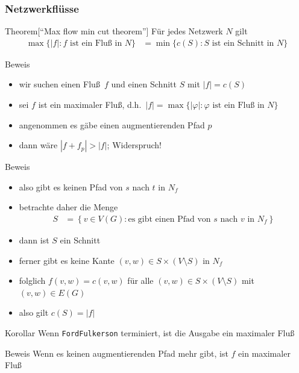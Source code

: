 \documentclass[aspectratio=1610, 11pt]{beamer}
\newcommand\cbc[1]{\left\{{#1}\right\}}
\newcommand{\mytitle}{Netzwerkfl\"usse}
\begin{document}
\begin{frame}\frametitle{\mytitle}
	\begin{overprint}
		\begin{block}{Theorem\hfill[``Max flow min cut theorem'']}
			F\"ur jedes Netzwerk $N$ gilt
			\begin{align*}
				\max\{|f|:f\mbox{ ist ein Flu\ss\ in $N$}\}&=\min\{c(S):S\mbox{ ist ein Schnitt in }N\}
			\end{align*}
		\end{block}
		\begin{exampleblock}{Beweis}
			\begin{itemize}
				\item wir suchen einen Flu\ss\ $f$ und einen Schnitt $S$ mit $|f|=c(S)$
				\item sei $f$ ist ein maximaler Flu\ss, d.h.\ $|f|=\max\{|\varphi|:\varphi\mbox{ ist ein Flu\ss\ in $N$}\}$
				\item angenommen es g\"abe einen augmentierenden Pfad $p$
				\item dann w\"are $|f+f_p|>|f|$; Widerspruch!
			\end{itemize}
		\end{exampleblock}
		\begin{exampleblock}{Beweis}
			\begin{itemize}
				\item also gibt es keinen Pfad von $s$ nach $t$ in $N_f$
				\item betrachte daher die Menge
					\begin{align*}
						S&=\cbc{v\in V(G):\mbox{es gibt einen Pfad von $s$ nach $v$ in $N_f$}}
					\end{align*}
				\item dann ist $S$ ein Schnitt
				\item ferner gibt es keine Kante $(v,w)\in S\times (V\setminus S)$ in $N_f$
				\item folglich $f(v,w)=c(v,w)$ f\"ur alle $(v,w)\in S\times (V\setminus S)$ mit $(v,w)\in E(G)$
				\item also gilt $c(S)=|f|$
			\end{itemize}
		\end{exampleblock}
		\begin{block}{Korollar}
			Wenn {\tt FordFulkerson} terminiert, ist die Ausgabe ein maximaler Flu\ss
		\end{block}
		\begin{exampleblock}{Beweis}
Wenn es keinen augmentierenden Pfad mehr gibt, ist $f$ ein maximaler Flu\ss

\end{exampleblock}
\end{overprint}
\end{frame}
\end{document}
